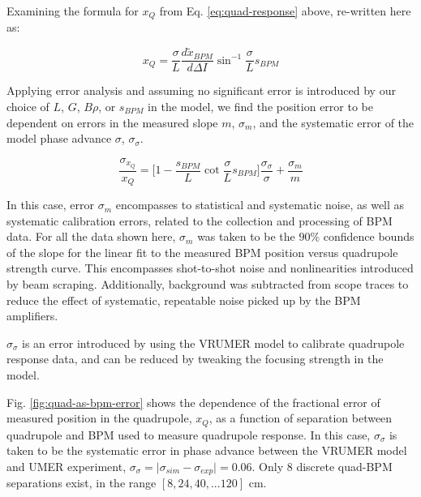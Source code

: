 Examining the formula for $x_Q$ from Eq. \ref{eq:quad-response} above, re-written here as:

\begin{equation} x_Q = \frac{\sigma}{L} \frac{d \tilde{x}_{BPM}}{d \Delta I} \sin^{-1} \frac{\sigma}{L}s_{BPM} \end{equation}


Applying error analysis and assuming no significant error is introduced by our choice of $L$, $G$, $B\rho$, or $s_{BPM}$ in the model, we find the position error to be dependent on errors in the measured slope $m$, $\sigma_m$, and the systematic error of the model phase advance $\sigma$, $\sigma_\sigma$. 

\begin{equation} \frac{\sigma_{x_Q}}{x_Q} = \bigg[1-\frac{s_{BPM}}{L}\cot{\frac{\sigma}{L}s_{BPM}} \bigg]\frac{\sigma_\sigma}{\sigma} + \frac{\sigma_m}{m} 
\label{eq:quad-as-bpm-error}
\end{equation}

In this case, error $\sigma_m$ encompasses to statistical and systematic noise, as well as systematic calibration errors, related to the collection and processing of BPM data. For all the data shown here, $\sigma_m$ was taken to be the $90\%$ confidence bounds of the slope for the linear fit to the measured BPM position versus quadrupole strength curve. This encompasses shot-to-shot noise and nonlinearities introduced by beam scraping. Additionally, background was subtracted from scope traces to reduce the effect of systematic, repeatable noise picked up by the BPM amplifiers. 

$\sigma_\sigma$ is an error introduced by using the VRUMER model to calibrate quadrupole response data, and can be reduced by tweaking the focusing strength in the model. 

Fig. \ref{fig:quad-as-bpm-error} shows the dependence of the fractional error of measured position in the quadrupole, $x_Q$, as a function of separation between quadrupole and BPM used to measure quadrupole response. In this case, $\sigma_\sigma$ is taken to be the systematic error in phase advance between the VRUMER model and UMER experiment, $\sigma_\sigma = \mid \sigma_{sim} - \sigma_{exp} \mid = 0.06$. Only 8 discrete quad-BPM separations exist, in the range $[8,24,40,... 120]$ cm.


